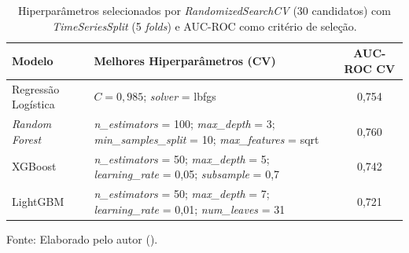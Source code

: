 \begin{table}[htbp]
    \centering
    \caption[Hiperparâmetros selecionados]{Hiperparâmetros selecionados por \textit{RandomizedSearchCV} (30 candidatos) com \textit{TimeSeriesSplit} (5 \textit{folds}) e AUC-ROC como critério de seleção.}
    \label{tab:hiperparametros}
    \small
    \begin{tabular}{lp{7.4cm}c}
        \toprule
        \textbf{Modelo} & \textbf{Melhores Hiperparâmetros (CV)} & \textbf{AUC-ROC CV} \\
        \midrule
        Regressão Logística & $C = 0{,}985$; \textit{solver} = lbfgs & 0,754 \\
        \textit{Random Forest} & \textit{n\_estimators} = 100; \textit{max\_depth} = 3; \textit{min\_samples\_split} = 10; \textit{max\_features} = sqrt & 0,760 \\
        XGBoost & \textit{n\_estimators} = 50; \textit{max\_depth} = 5; \textit{learning\_rate} = 0,05; \textit{subsample} = 0,7 & 0,742 \\
        LightGBM & \textit{n\_estimators} = 50; \textit{max\_depth} = 7; \textit{learning\_rate} = 0,01; \textit{num\_leaves} = 31 & 0,721 \\
        \bottomrule
    \end{tabular}

    \vspace{2pt}
    {\small Fonte: Elaborado pelo autor (\the\year).}
\end{table}
